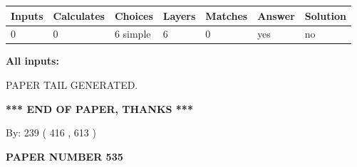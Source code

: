 \documentclass[12pt]{article}
\begin{document}
 
\noindent{}
 
 
   
   
   
   
\noindent\begin{tabular}{|l|l|l|l|l|l|l|}
 \hline
Inputs & Calculates & Choices & Layers & Matches & Answer & Solution \\ \hline
 0  & 
 0  & 
 6
  simple  
  & 
 6  & 
 0  & 
  yes & 
  no 
  \\ \hline
 \end{tabular}
   
   
   
   
\noindent{}
   
   
   
   
\noindent\vspace{0.1in}\hspace{-0.08in} {\textbf{\Large{All inputs: }}}
   
   
   
   
   
   
 \vspace{0.2in}
 
   
   
\vspace{2.0in} PAPER TAIL GENERATED.
   
   
   
   
\vspace{1.0in} 
{\textbf{\large{ *** END OF PAPER, THANKS *** }}} 
   
   
\hspace{1.0in} By: 
 239 ( 416 ,  613 )
   
   
   
   
\newpage 
\setcounter{page}{ 
   535001 } 
   
   
   
   
 {\textbf{ \Large{ PAPER NUMBER  535  }}}
   
   
\vspace{0.2in}
   
   
   
   
   
   
   
   
 \vspace{0.2in}
 
\end{document}
